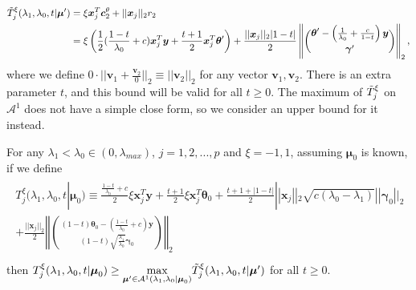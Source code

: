 \begin{gather}
    \label{eq:ttildexi}
    \begin{aligned}
        \Tilde{T}^\xi_j(\lambda_1,\lambda_0,t|\boldsymbol\mu')&=\xi\boldsymbol x_j^T\boldsymbol c_2^\theta+||\boldsymbol x_j||_2r_2\\
        &=\xi\left( \frac{1}{2}(\frac{1-t}{\lambda_0}+c)\boldsymbol x_j^T\boldsymbol y+\frac{t+1}{2}\boldsymbol x_j^T\boldsymbol\theta'\right)+\frac{||\boldsymbol x_j||_2|1-t|}{2}\left\Vert\binom{\boldsymbol\theta'-\left(\frac{1}{\lambda_0}+\frac{c}{1-t}\right)\boldsymbol y}{\boldsymbol\gamma'}\right\Vert_2,\\
    \end{aligned}
\end{gather}
where we define $0\cdot||\boldsymbol v_1+\frac{\boldsymbol v_2}{0}||_2\equiv ||\boldsymbol v_2||_2$ for any vector $\boldsymbol v_1,\boldsymbol v_2$. There is an extra parameter $t$, and this bound will be valid for all $t\geq 0$. The maximum of $\Tilde{T}^\xi_j$ on $\mathcal{A}^1$ does not have a simple close form, so we consider an upper bound for it instead.

\begin{theorem}
    \label{thm:2.1}
    For any $\lambda_1<\lambda_{0}\in (0,\lambda_{max})$, $j=1,2,...,p$ and $\xi=-1,1$, assuming $\boldsymbol\mu_0$ is known, if we define
    \begin{gather}
        \begin{aligned}
            T^\xi_j(\lambda_1,\lambda_0,t|\boldsymbol\mu_0)\equiv\frac{\frac{1-t}{\lambda_0}+c}{2}\xi\boldsymbol x_j^T \boldsymbol y+\frac{t+1}{2}\xi \boldsymbol x_j^T \boldsymbol \theta_{0}+\frac{t+1+|1-t|}{2}||\boldsymbol x_j||_2\sqrt{c(\lambda_0-\lambda_1)}||\boldsymbol\gamma_{0}||_2\\+\frac{||\boldsymbol x_j||_2}{2}\left\Vert\binom{(1-t)\boldsymbol\theta_{0}-\left(\frac{1-t}{\lambda_0}+c\right)\boldsymbol y}{(1-t)\sqrt{\frac{\lambda_1}{\lambda_0}}\boldsymbol\gamma_{0}}\right\Vert_2\\
        \end{aligned}
    \end{gather}
    then $T^\xi_j(\lambda_1,\lambda_0,t|\boldsymbol\mu_0)\geq\underset{\boldsymbol\mu'\in\mathcal{A}^1(\lambda_1,\lambda_0|\boldsymbol\mu_0)}{\mathrm{max}}\Tilde{T}^\xi_j(\lambda_1,\lambda_0,t|\boldsymbol\mu')$ for all $t\geq0$.
\end{theorem}

